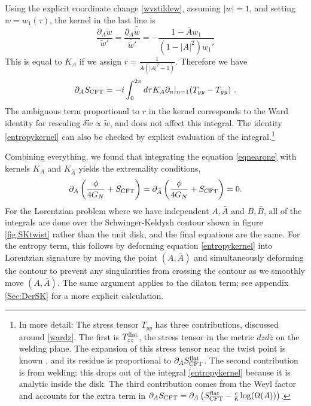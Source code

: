 \documentclass[12pt]{article}
\newcommand{\p}{\partial}
\newcommand{\f}{\frac}
\newcommand{\be}{\begin{equation}}
\newcommand{\ee}{\end{equation}}
\def\be{\begin{eqnarray}}
\def\ee{\end{eqnarray}}
\let\l=\lambda \let\m=\mu \let\n=\nu \let\x=\xi \let\p=\phi \let\r=v
\let\f=\frac
\let\pa=\partial
\def\be{\begin{equation}}
\def\ee{\end{equation}}
\def\ba{\begin{eqnarray}}
\def\ea{\end{eqnarray}}
\renewcommand{\p}{\partial}
\numberwithin{equation}{section}
\def\m{{\mu}}
\def\n{{\nu}}
\def\p{{\phi}}
\def\be{\begin{equation}}
\def\ee{\end{equation}}
\def\ba{\begin{eqnarray}}
\def\ea{\end{eqnarray}}
\def\r{\rightarrow}
\def\f {\frac}
\def\l{\left}
\def\r{\right}
\def \bA {\bar{A}}
\def\x{\bar{x}}
\def \be {\begin{equation}}
\def \ee {\end{equation}}
\renewcommand{\p}{\partial}
\newcommand{\by}{\bar{y}}
\begin{document}
\begin{spacing}{1.1}
 Using the explicit coordinate change \eqref{wvstildew}, assuming $|w|=1$, and setting $w = w_1(\tau)$, the kernel in the last line is
\be\label{derw}
\frac{\p_A \tilde{w}}{\tilde{w}'} = \frac{\p_A \bar{ \tilde{w}}}{\bar{\tilde{w}}'} = 
-\frac{1-\bar{A}w_1}{(1-|A|^2)w_1'} 
\ee
This is equal to $K_A$ if we assign $r = \frac{1}{A(|A|^2-1)}$. Therefore we have
\be\label{entropykernel}
\p_A S_{\rm CFT} =-i \int_0^{2\pi}d\tau  K_A \p_n|_{n=1}(T_{yy} - T_{\by \by} ) \ .
\ee
The ambiguous term proportional to $r$ in the kernel corresponds to the Ward identity for rescaling $\delta \tilde{w} \propto \tilde{w}$, and does not affect this integral. The identity \eqref{entropykernel} can also be checked by explicit evaluation of the integral.\footnote{In more detail: The stress tensor $T_{yy}$ has three contributions, discussed around \eqref{wardz}. The first is $T_{zz}^{\rm flat}$, the stress tensor in the metric $dz d\bar{z}$ on the welding plane. The expansion of this stress tensor near the twist point is known \cite{Calabrese:2004eu,Calabrese:2009qy}, and its residue is proportional to $\p_{A} S_{\rm CFT}^{\rm flat}$. The second contribution is from welding; this drops out of the integral \eqref{entropykernel} because it is analytic inside the disk. The third contribution comes from the Weyl factor and accounts for the extra term in $\p_A S_{\rm CFT} = \p_A\left( S_{\rm CFT}^{\rm flat} -\f{c}{6} \log( \Omega(A) ) \right)$.}


Combining everything, we found that integrating the equation \eqref{eqnearone} with kernels $K_{A}$ and $K_{\bA}$ yields the extremality conditions,
\ba
\pa_{A} \l( \f{\phi}{4 G_N} +S_{\rm CFT} \r) = \pa_{\bA} \l(  \f{\phi}{4 G_N}+S_{\rm CFT} \r)=0.
\ea
For the Lorentzian problem where we have independent $A, \bar{A}$ and $B,\bar{B}$, all of the integrals are done over the Schwinger-Keldysh contour shown in figure \ref{fig:SKtwist} rather than the unit disk, and the final equations are the same. For the entropy term, this follows by deforming equation \eqref{entropykernel} into Lorentzian signature by moving the point $(A,\bar{A})$ and simultaneously deforming the contour to prevent any singularities from crossing the contour as we smoothly move $(A,\bar{A})$. The same argument applies to the dilaton term; see appendix \ref{Sec:DerSK} for a more explicit calculation.




\end{spacing}
\end{document}

